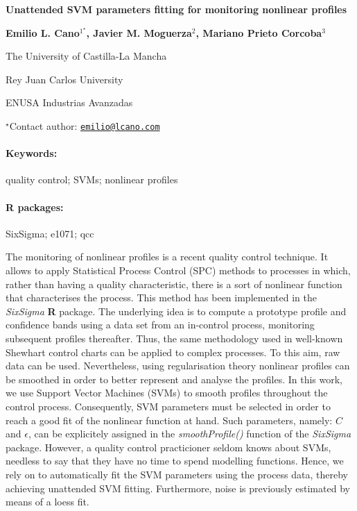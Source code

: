 \documentclass[11pt, a4paper]{article}
\renewcommand{\title}[1]{\begin{center}{\bf \LARGE #1}\end{center}}
\newcommand{\keywords}{\paragraph{Keywords:}}
\newcommand{\packages}{\paragraph{R packages:}}
\begin{document}
\pagestyle{empty}

\title{Unattended SVM parameters fitting for monitoring nonlinear profiles}

\begin{center}
  {\bf Emilio L. Cano$^{1^\star}$, Javier M. Moguerza$^{2}$, Mariano Prieto Corcoba$^{3}$}
\end{center}

\vskip 0.3cm

\begin{affiliations}
\begin{enumerate}
\begin{minipage}{0.915\textwidth}
\centering
\item The University of Castilla-La Mancha \\[-2pt]
\item Rey Juan Carlos University \\[-2pt]
\item ENUSA Industrias Avanzadas \\[-2pt]
\end{minipage}
\end{enumerate}
$^\star$Contact author: \href{mailto:emilio@lcano.com}{\nolinkurl{emilio@lcano.com}}\\
\end{affiliations}

\vskip 0.5cm

\begin{minipage}{0.915\textwidth}
\keywords quality control; SVMs; nonlinear profiles
\packages SixSigma; e1071; qcc
\end{minipage}

\vskip 0.8cm

The monitoring of nonlinear profiles is a recent quality control
technique. It allows to apply Statistical Process Control (SPC) methods
to processes in which, rather than having a quality characteristic,
there is a sort of nonlinear function that characterises the process.
This method has been implemented in the \emph{SixSigma} \textbf{R}
package. The underlying idea is to compute a prototype profile and
confidence bands using a data set from an in-control process, monitoring
subsequent profiles thereafter. Thus, the same methodology used in
well-known Shewhart control charts can be applied to complex processes.
To this aim, raw data can be used. Nevertheless, using regularisation
theory nonlinear profiles can be smoothed in order to better represent
and analyse the profiles. In this work, we use Support Vector Machines
(SVMs) to smooth profiles throughout the control process. Consequently,
SVM parameters must be selected in order to reach a good fit of the
nonlinear function at hand. Such parameters, namely: \(C\) and
\(\epsilon\), can be explicitely assigned in the \emph{smoothProfile()}
function of the \emph{SixSigma} package. However, a quality control
practicioner seldom knows about SVMs, needless to say that they have no
time to spend modelling functions. Hence, we rely on to automatically
fit the SVM parameters using the process data, thereby achieving
unattended SVM fitting. Furthermore, noise is previously estimated by
means of a loess fit.
\end{document}
